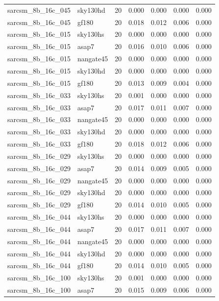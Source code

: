 \begin{tabular}{llrrrrr}
sarcsm\_8b\_16c\_045 & sky130hd & 20 & 0.000 & 0.000 & 0.000 & 0.000 \\
sarcsm\_8b\_16c\_045 & gf180 & 20 & 0.018 & 0.012 & 0.006 & 0.000 \\
sarcsm\_8b\_16c\_015 & sky130hs & 20 & 0.000 & 0.000 & 0.000 & 0.000 \\
sarcsm\_8b\_16c\_015 & asap7 & 20 & 0.016 & 0.010 & 0.006 & 0.000 \\
sarcsm\_8b\_16c\_015 & nangate45 & 20 & 0.000 & 0.000 & 0.000 & 0.000 \\
sarcsm\_8b\_16c\_015 & sky130hd & 20 & 0.000 & 0.000 & 0.000 & 0.000 \\
sarcsm\_8b\_16c\_015 & gf180 & 20 & 0.013 & 0.009 & 0.004 & 0.000 \\
sarcsm\_8b\_16c\_033 & sky130hs & 20 & 0.001 & 0.000 & 0.000 & 0.000 \\
sarcsm\_8b\_16c\_033 & asap7 & 20 & 0.017 & 0.011 & 0.007 & 0.000 \\
sarcsm\_8b\_16c\_033 & nangate45 & 20 & 0.000 & 0.000 & 0.000 & 0.000 \\
sarcsm\_8b\_16c\_033 & sky130hd & 20 & 0.000 & 0.000 & 0.000 & 0.000 \\
sarcsm\_8b\_16c\_033 & gf180 & 20 & 0.018 & 0.012 & 0.006 & 0.000 \\
sarcsm\_8b\_16c\_029 & sky130hs & 20 & 0.000 & 0.000 & 0.000 & 0.000 \\
sarcsm\_8b\_16c\_029 & asap7 & 20 & 0.014 & 0.009 & 0.005 & 0.000 \\
sarcsm\_8b\_16c\_029 & nangate45 & 20 & 0.000 & 0.000 & 0.000 & 0.000 \\
sarcsm\_8b\_16c\_029 & sky130hd & 20 & 0.000 & 0.000 & 0.000 & 0.000 \\
sarcsm\_8b\_16c\_029 & gf180 & 20 & 0.014 & 0.010 & 0.005 & 0.000 \\
sarcsm\_8b\_16c\_044 & sky130hs & 20 & 0.000 & 0.000 & 0.000 & 0.000 \\
sarcsm\_8b\_16c\_044 & asap7 & 20 & 0.017 & 0.011 & 0.007 & 0.000 \\
sarcsm\_8b\_16c\_044 & nangate45 & 20 & 0.000 & 0.000 & 0.000 & 0.000 \\
sarcsm\_8b\_16c\_044 & sky130hd & 20 & 0.000 & 0.000 & 0.000 & 0.000 \\
sarcsm\_8b\_16c\_044 & gf180 & 20 & 0.014 & 0.010 & 0.005 & 0.000 \\
sarcsm\_8b\_16c\_100 & sky130hs & 20 & 0.001 & 0.000 & 0.000 & 0.000 \\
sarcsm\_8b\_16c\_100 & asap7 & 20 & 0.015 & 0.009 & 0.006 & 0.000 \\

\end{tabular}

